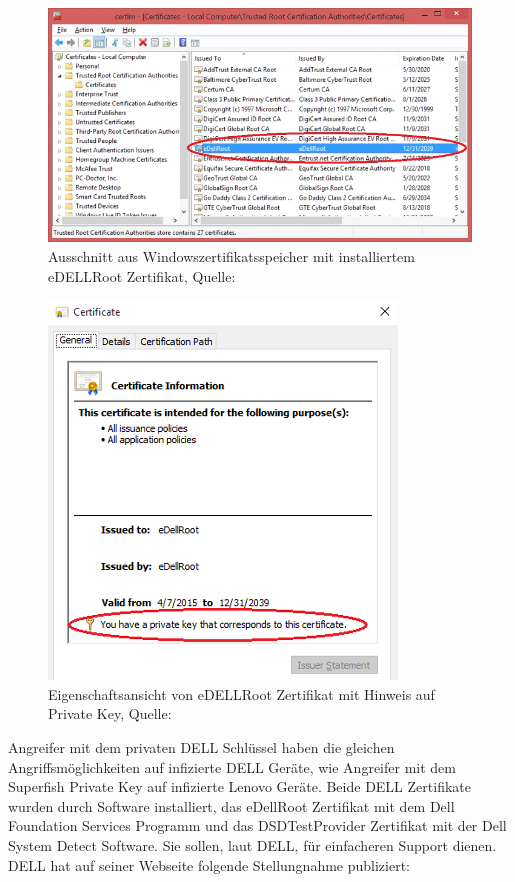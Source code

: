 \begin{figure}[H]
	\centering
	\includegraphics[width=.7\linewidth]{images/eDELLRoot.png}
	\caption{Ausschnitt aus Windowszertifikatsspeicher mit installiertem eDELLRoot Zertifikat, Quelle: \cite{dell}}
\end{figure}
	
\begin{figure}[H]
	\centering
	\includegraphics[width=.4\linewidth]{images/cert_eDELLRoot.png}
	\caption{Eigenschaftsansicht von eDELLRoot Zertifikat mit Hinweis auf Private Key, Quelle: \cite{dell_joe_nord}}
\end{figure}
\noindent
Angreifer mit dem privaten DELL Schlüssel haben die gleichen Angriffsmöglichkeiten auf infizierte DELL Geräte, wie Angreifer mit dem Superfish Private Key auf infizierte Lenovo Geräte.
Beide DELL Zertifikate wurden durch Software installiert, das eDellRoot Zertifikat mit dem Dell Foundation Services Programm und das DSDTestProvider Zertifikat mit der Dell System Detect Software. 
Sie sollen, laut DELL, für einfacheren Support dienen. 
DELL hat auf seiner Webseite folgende Stellungnahme publiziert: 
